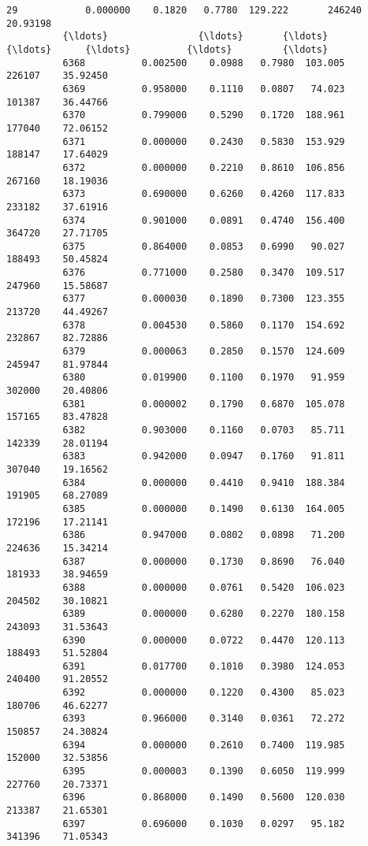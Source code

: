 \documentclass[11pt]{article}
\begin{document}
\begin{Verbatim}[commandchars=\\\{\}]
          29            0.000000    0.1820   0.7780  129.222       246240    20.93198   
          {\ldots}                {\ldots}       {\ldots}      {\ldots}      {\ldots}          {\ldots}         {\ldots}   
          6368          0.002500    0.0988   0.7980  103.005       226107    35.92450   
          6369          0.958000    0.1110   0.0807   74.023       101387    36.44766   
          6370          0.799000    0.5290   0.1720  188.961       177040    72.06152   
          6371          0.000000    0.2430   0.5830  153.929       188147    17.64029   
          6372          0.000000    0.2210   0.8610  106.856       267160    18.19036   
          6373          0.690000    0.6260   0.4260  117.833       233182    37.61916   
          6374          0.901000    0.0891   0.4740  156.400       364720    27.71705   
          6375          0.864000    0.0853   0.6990   90.027       188493    50.45824   
          6376          0.771000    0.2580   0.3470  109.517       247960    15.58687   
          6377          0.000030    0.1890   0.7300  123.355       213720    44.49267   
          6378          0.004530    0.5860   0.1170  154.692       232867    82.72886   
          6379          0.000063    0.2850   0.1570  124.609       245947    81.97844   
          6380          0.019900    0.1100   0.1970   91.959       302000    20.40806   
          6381          0.000002    0.1790   0.6870  105.078       157165    83.47828   
          6382          0.903000    0.1160   0.0703   85.711       142339    28.01194   
          6383          0.942000    0.0947   0.1760   91.811       307040    19.16562   
          6384          0.000000    0.4410   0.9410  188.384       191905    68.27089   
          6385          0.000000    0.1490   0.6130  164.005       172196    17.21141   
          6386          0.947000    0.0802   0.0898   71.200       224636    15.34214   
          6387          0.000000    0.1730   0.8690   76.040       181933    38.94659   
          6388          0.000000    0.0761   0.5420  106.023       204502    30.10821   
          6389          0.000000    0.6280   0.2270  180.158       243093    31.53643   
          6390          0.000000    0.0722   0.4470  120.113       188493    51.52804   
          6391          0.017700    0.1010   0.3980  124.053       240400    91.20552   
          6392          0.000000    0.1220   0.4300   85.023       180706    46.62277   
          6393          0.966000    0.3140   0.0361   72.272       150857    24.30824   
          6394          0.000000    0.2610   0.7400  119.985       152000    32.53856   
          6395          0.000003    0.1390   0.6050  119.999       227760    20.73371   
          6396          0.868000    0.1490   0.5600  120.030       213387    21.65301   
          6397          0.696000    0.1030   0.0297   95.182       341396    71.05343   
          

\end{Verbatim}
\end{document}
